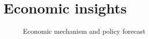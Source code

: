 \section{Economic insights}
\begin{frame}{\insertsection}
  \begin{figure}[h!]\centering
  \hspace{0.5cm}
  \caption{Economic mechanism and policy forecast}\label{Economic mechanism and policy forecast}
  \end{figure}
\end{frame}
